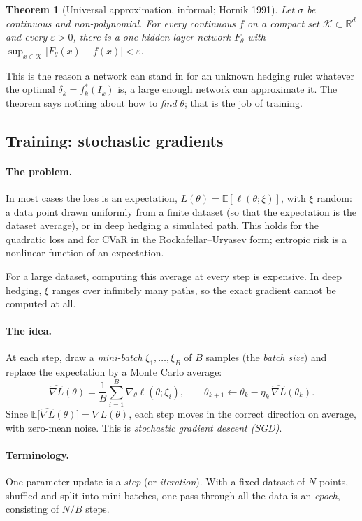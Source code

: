 \documentclass[11pt]{article}
\newtheorem{theorem}{Theorem}[section]
\theoremstyle{definition}
\theoremstyle{remark}
\newcommand{\R}{\mathbb{R}}
\begin{document}
\begin{theorem}[Universal approximation, informal; Hornik 1991]
Let $\sigma$ be continuous and non-polynomial. For every continuous $f$ on a compact set $\mathcal K\subset\R^d$
and every $\varepsilon>0$, there is a one-hidden-layer network $F_\theta$ with
$\sup_{x\in\mathcal K}|F_\theta(x)-f(x)|<\varepsilon$.
\end{theorem}

This is the reason a network can stand in for an unknown hedging rule: whatever the optimal
$\delta_k=f^*_k(I_k)$ is, a large enough network can approximate it. The theorem says nothing about
how to \emph{find} $\theta$; that is the job of training.

\subsection{Training: stochastic gradients}

\paragraph{The problem.} In most cases the loss is an expectation, $L(\theta)=\mathbb E[\ell(\theta;\xi)]$, with $\xi$ random: a data point drawn uniformly from a finite dataset (so that the expectation is the dataset average), or in deep hedging a simulated path. This holds for the quadratic loss and for CVaR in the Rockafellar--Uryasev form; entropic risk is a nonlinear function of an expectation.

For a large dataset, computing this average at every step is expensive.
In deep hedging, $\xi$ ranges over infinitely many paths, so the exact gradient cannot be computed at all.

\paragraph{The idea.} At each step, draw a \emph{mini-batch} $\xi_1,\dots,\xi_B$ of $B$ samples (the \emph{batch size}) and replace the
expectation by a Monte Carlo average:
\[
\widehat{\nabla L}(\theta)=\frac1B\sum_{i=1}^B\nabla_\theta\ell(\theta;\xi_i),\qquad
\theta_{k+1}\leftarrow\theta_{k}-\eta_k\,\widehat{\nabla L}(\theta_k).
\]
Since $\mathbb E\bigl[\widehat{\nabla L}(\theta)\bigr]=\nabla L(\theta)$, each step moves in the correct direction on average, with zero-mean noise.
This is \emph{stochastic gradient descent (SGD)}.

\paragraph{Terminology.} One parameter update is a \emph{step} (or \emph{iteration}). With a fixed dataset of $N$ points, shuffled and split
into mini-batches, one pass through all the data is an \emph{epoch}, consisting of $N/B$ steps.
\end{document}
